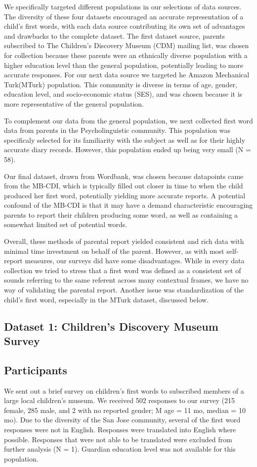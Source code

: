 \documentclass[10pt,letterpaper]{article}
\begin{document}
We specifically targeted different populations in our selections of data sources. The diversity of these four datasets encouraged an accurate representation of a child's first words, with each data source contributing its own set of advantages and drawbacks to the complete dataset. The first dataset source,  parents subscribed to The Children's Discovery Museum (CDM) mailing list, was chosen for collection because these parents were an ethnically diverse population with a higher education level than the general population, potentially leading to more accurate responses. For our next data source we targeted he Amazon Mechanical Turk(MTurk) population. This community is diverse in terms of age, gender, education level, and socio-economic status (SES), and was chosen because it is more representative of the general population.

To complement our data from the general population, we next collected first word data from parents in the Psycholinguistic community. This population was specificaly selected for its familiarity with the subject as well as for their highly accurate diary records. However, this population ended up being very small (N = 58).

Our final dataset, drawn from Wordbank, was chosen because datapoints came from the MB-CDI, which is typically filled out closer in time to when the child produced her first word, potentially yielding more accurate reports. A potential confound of the MB-CDI is that it may have a demand characteristic encouraging parents to report their children producing some word, as well as containing a somewhat limited set of potential words.

Overall, these methods of parental report yielded consistent and rich data with minimal time investment on behalf of the parent. However, as with most self-report measures, our surveys did have some disadvantages. While in every data collection we tried to stress that a first word was defined as a consistent set of sounds referring to the same referent across many contextual frames, we have no way of validating the parental report. Another issue was standardization of the child's first word, especially in the MTurk dataset, discussed below. 

\subsection{Dataset 1: Children's Discovery Museum Survey}

\subsection{Participants}
We sent out a brief survey on children's first words to subscribed members of a large local children's museum. We received 502 responses to our survey (215 female, 285 male, and 2 with no reported gender; M age = 11 mo, median = 10 mo). Due to the diversity of the San Jose community, several of the first word responses were not in English. Responses were translated into English where possible. Responses that were not able to be translated were excluded from further analysis (N = 1). Guardian education level was not available for this population.
\end{document}
